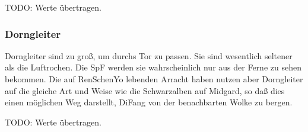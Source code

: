 \documentclass[
a4paper,
twoside,
DIV=calc,
BCOR=4mm,
fontsize=9pt,
twocolumn=on,
titlepage=on,
parskip=half
]{scrartcl}
\begin{document}
TODO: Werte übertragen.

\subsubsection{Dorngleiter}

Dorngleiter sind zu groß, um durchs Tor zu passen. Sie sind wesentlich
seltener als die Luftrochen. Die SpF werden sie wahrscheinlich nur aus
der Ferne zu sehen bekommen. Die auf RenSchenYo lebenden Arracht haben
nutzen aber Dorngleiter auf die gleiche Art und Weise wie die
Schwarzalben auf Midgard, so daß dies einen möglichen Weg darstellt,
DiFang von der benachbarten Wolke zu bergen.

TODO: Werte übertragen.
\end{document}
